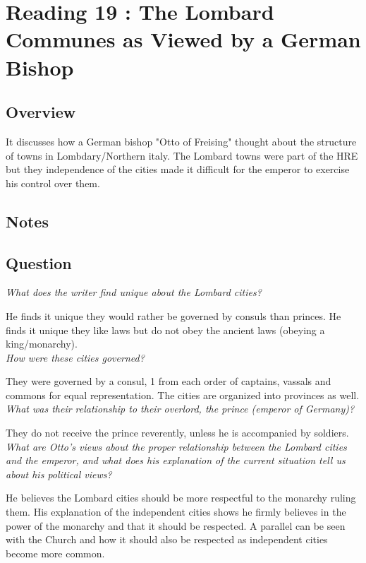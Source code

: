 \documentclass[12pt]{article}
\begin{document}
\section*{Reading 19 : The Lombard Communes as Viewed by a German Bishop}

\subsection*{Overview}

It discusses how a German bishop "Otto of Freising" thought about the structure of towns in Lombdary/Northern italy. The Lombard towns were part of the HRE but they independence of the cities made it difficult for the emperor to exercise his control over them. 

\subsection*{Notes}

\subsection*{Question}

\textit{What does the writer find unique about the Lombard cities?}

He finds it unique they would rather be governed by consuls than princes. He finds it unique they like laws but do not obey the ancient laws (obeying a king/monarchy).\\

\textit{How were these cities governed?}

They were governed by a consul, 1 from each order of captains, vassals and commons for equal representation. The cities are organized into provinces as well.\\

\textit{What was their relationship to their overlord, the prince (emperor of Germany)?}

They do not receive the prince reverently, unless he is accompanied by soldiers.\\

\textit{What are Otto's views about the proper relationship between the Lombard cities and the emperor, and what does his explanation of the current situation tell us about his political views?}

He believes the Lombard cities should be more respectful to the monarchy ruling them. His explanation of the independent cities shows he firmly believes in the power of the monarchy and that it should be respected. A parallel can be seen with the Church and how it should also be respected as independent cities become more common.\\
\end{document}
